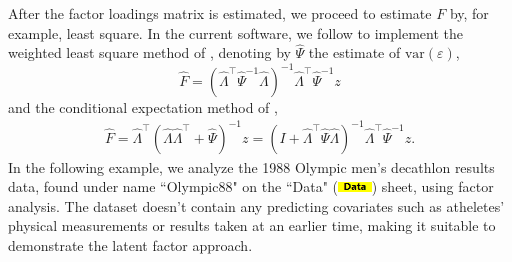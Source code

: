 \documentclass[article]{jss}
\numberwithin{equation}{subsection}
\newcommand{\shtData}{``Data" (\includegraphics[height=8pt, keepaspectratio=true]{DataSheetTab_png}) }
\begin{document}
        After the factor loadings matrix is estimated, we proceed to estimate $F$ by, for example, least square. In the current software, we follow \cite{anderson2003introMVA3e} to implement the weighted least square method of \cite{bartlett1938}, denoting by $\hat{\Psi}$ the estimate of $\textrm{var}(\varepsilon)$,
        \begin{equation}\label{eq:bartlett factor score}
	        \hat F = {\left( {{\hat\Lambda ^\intercal}{\hat\Psi ^{ - 1}}\hat\Lambda} \right)^{ - 1}}{\hat\Lambda ^\intercal}{\hat\Psi ^{ - 1}}z
	    \end{equation}
        and the conditional expectation method of \cite{Thomson1951},
        \begin{align}\label{eq:thomson factor score}
	        \hat F = {\hat\Lambda ^\intercal}{\left( {\hat\Lambda {\hat\Lambda ^\intercal} + \hat\Psi } \right)^{ - 1}}z = {\left( {I + {\hat\Lambda ^\intercal}\hat\Psi \hat\Lambda } \right)^{ - 1}}{\hat\Lambda ^\intercal}{\hat\Psi ^{ - 1}}z.
	    \end{align}
        In the following example, we analyze the 1988 Olympic men's decathlon results data, found under name ``Olympic88" on the \shtData sheet, using factor analysis. The dataset doesn't contain any predicting covariates such as atheletes' physical measurements or results taken at an earlier time, making it suitable to demonstrate the latent factor approach.
\end{document}
